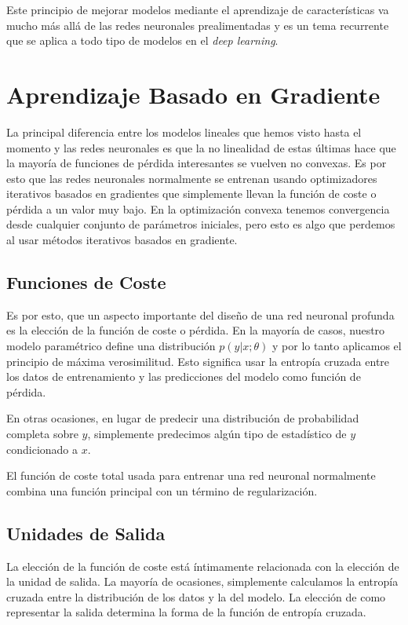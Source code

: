 Este principio de mejorar modelos mediante el aprendizaje de características va mucho más allá de las redes neuronales prealimentadas y es un tema recurrente que se aplica a todo tipo de modelos en el \textit{deep learning}.

\section{Aprendizaje Basado en Gradiente}
La principal diferencia entre los modelos lineales que hemos visto hasta el momento y las redes neuronales es que la no linealidad de estas últimas hace que la mayoría de funciones de pérdida interesantes se vuelven no convexas. Es por esto que las redes neuronales normalmente se entrenan usando optimizadores iterativos basados en gradientes que simplemente llevan la función de coste o pérdida a un valor muy bajo. En la optimización convexa tenemos convergencia desde cualquier conjunto de parámetros iniciales, pero esto es algo que perdemos al usar métodos iterativos basados en gradiente.

\subsection{Funciones de Coste}
Es por esto, que un aspecto importante del diseño de una red neuronal profunda es la elección de la función de coste o pérdida. En la mayoría de casos, nuestro modelo paramétrico define una distribución $p(y | x; \theta)$ y por lo tanto aplicamos el principio de máxima verosimilitud. Esto significa usar la entropía cruzada entre los datos de entrenamiento y las predicciones del modelo como función de pérdida. 

En otras ocasiones, en lugar de predecir una distribución de probabilidad completa sobre $y$, simplemente predecimos algún tipo de estadístico de $y$ condicionado a $x$.

El función de coste total usada para entrenar una red neuronal normalmente combina una función principal con un término de regularización.

\subsection{Unidades de Salida}
La elección de la función de coste está íntimamente relacionada con la elección de la unidad de salida. La mayoría de ocasiones, simplemente calculamos la entropía cruzada entre la distribución de los datos y la del modelo. La elección de como representar la salida determina la forma de la función de entropía cruzada.

